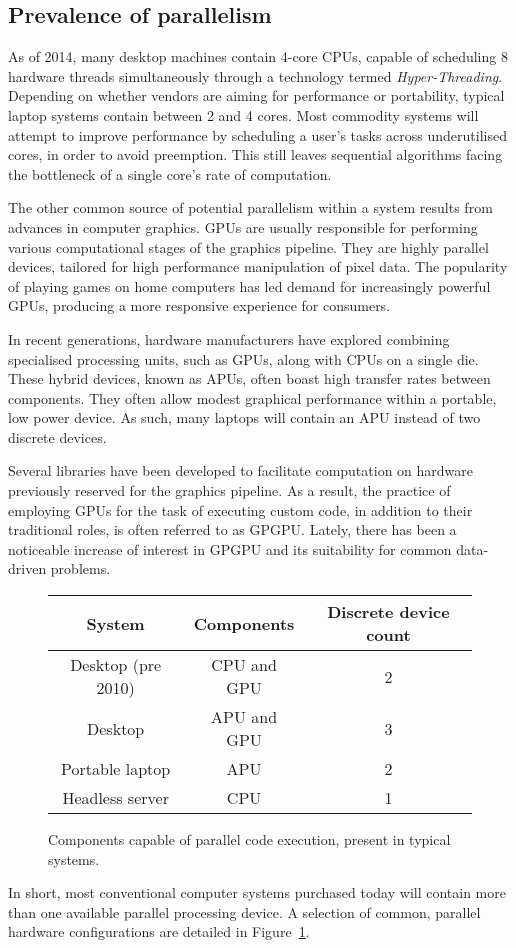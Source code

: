 \subsection{Prevalence of parallelism}
As of 2014, many desktop machines contain 4-core \acp{CPU}, capable of scheduling 8 hardware threads simultaneously through a technology termed \emph{Hyper-Threading}\cite{marr2002hyper}.
Depending on whether vendors are aiming for performance or portability, typical laptop systems contain between 2 and 4 cores.
Most commodity systems will attempt to improve performance by scheduling a user's tasks across underutilised cores, in order to avoid preemption. This still leaves sequential algorithms facing the bottleneck of a single core's rate of computation.

The other common source of potential parallelism within a system results from advances in computer graphics.
\acp{GPU} are usually responsible for performing various computational stages of the graphics pipeline. They are highly parallel devices, tailored for high performance manipulation of pixel data. The popularity of playing games on home computers has led demand for increasingly powerful \acp{GPU}, producing a more responsive experience for consumers.

In recent generations, hardware manufacturers have explored combining specialised processing units, such as \acp{GPU}, along with \acp{CPU} on a single die. These hybrid devices, known as \acp{APU}, often boast high transfer rates between components. They often allow modest graphical performance within a portable, low power device. As such, many laptops will contain an \ac{APU} instead of two discrete devices.

Several libraries have been developed to facilitate computation on hardware previously reserved for the graphics pipeline. As a result, the practice of employing \acp{GPU} for the task of executing custom code, in addition to their traditional roles, is often referred to as \ac{GPGPU}.
Lately, there has been a noticeable increase of interest in \ac{GPGPU} and its suitability for common data-driven problems.

\begin{figure}
\begin{center}
  \begin{tabular}{ | c | c | c |}
    \hline
    System & Components & Discrete device count \\ \hline
    Desktop (pre 2010) & \ac{CPU} and \ac{GPU} & 2 \\ \hline
    Desktop & \ac{APU} and \ac {GPU} & 3 \\ \hline
    Portable laptop & \ac{APU} & 2 \\ \hline
    Headless server & \ac{CPU} & 1 \\ \hline
    \end{tabular}
  \caption{Components capable of parallel code execution, present in typical systems.}
  \label{fig:par_table}
\end{center}
\end{figure}

In short, most conventional computer systems purchased today will contain more than one available parallel processing device. A selection of common, parallel hardware configurations are detailed in Figure~\ref{fig:par_table}.
